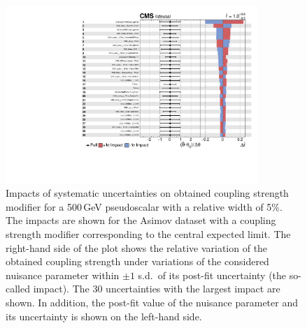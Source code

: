 \begin{figure}[!Hhtb]
\centering
\includegraphics[width=0.85\textwidth,keepaspectratio=true]{fig/app5/impacts/impacts_500.pdf}
\caption{Impacts of systematic uncertainties on obtained coupling strength modifier for a 500\,GeV pseudoscalar with a relative width of 5\%. The impacts are shown for the Asimov dataset with a coupling strength modifier corresponding to the central expected limit. The right-hand side of the plot shows the relative variation of the obtained coupling strength under variations of the considered nuisance parameter within $\pm 1$ s.d.\ of its post-fit uncertainty (the so-called impact). The 30 uncertainties with the largest impact are shown. In addition, the post-fit value of the nuisance parameter and its uncertainty is shown on the left-hand side.}
\label{fig:impacts_m500}
\end{figure}

